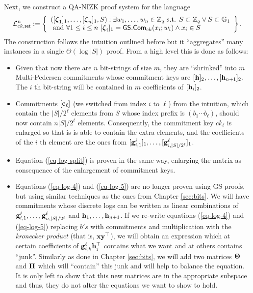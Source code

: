 Next, we construct a QA-NIZK proof system for the language
$$
\Lang_{ck,\mathsf{set}}^n:=\left\{\begin{array}{l}
([\grkb{\zeta}_1]_1,\ldots,[\grkb{\zeta}_n]_1,S):\exists w_1,\ldots,w_n\in\Z_q \text{ s.t. } S\subset\Z_q\vee S\subset \GG_1\\
\text{ and } \forall 1\leq i\leq n\ [\grkb{\zeta}_i]_1=\GS.\Com_{ck}(x_i;w_i)\wedge x_i\in S
\end{array}\right\}.
$$
The construction follows the intuition outlined before but it ``aggregates'' many instances in a single $\Theta(\log |S|)$ proof. From a high level this is done as follows:
\begin{itemize}
\item Given that now there are $n$ bit-strings of size $m$, they are ``shrinked'' into $m$ Multi-Pedersen commitments whose commitment keys are $[\mathbf{h}]_2,\ldots,[\mathbf{h}_{n+1}]_2$. The $i$ th bit-string will be contained in $m$ coefficients of $[\mathbf{h}_i]_2$.
\item Commitments $[\mathbf{c}_\ell]$ (we switched from index $i$ to $\ell$) from the intuition, which contain the $|S|/2^\ell$ elements from $S$ whose index prefix is $(b_1\cdots b_{\ell})$, should now contain $n|S|/2^\ell$ elements. Consequently, the commitment key $ck_\ell$ is enlarged so that is is able to contain the extra elements, and the coefficients of the $i$ th element are the ones from $[\mathbf{g}_{i,1}^\ell]_1,\ldots,[\mathbf{g}_{i,|S|/2^\ell}^\ell]_1$.
\item Equation (\ref{eq-log-split}) is proven in the same way, enlarging the matrix as consequence of the enlargement of commitment keys.
\item Equations (\ref{eq-log-4}) and (\ref{eq-log-5}) are no longer proven using GS proofs, but using similar techniques as the ones from Chapter \ref{sec:bits}. We will have commitments whose discrete logs can be written as linear combinations of $\mathbf{g}_{i,1}^\ell,\ldots,\mathbf{g}_{n,|S|/2^\ell}^\ell$ and $\mathbf{h}_1,\ldots,\mathbf{h}_{n+1}$. If we re-write equations (\ref{eq-log-4}) and (\ref{eq-log-5}) replacing $b's$ with commitments and multiplication with the \emph{kronecker product} (that is, $\mathbf{x}\mathbf{y}^\top$), we will obtain an expression which at certain coefficients of $\mathbf{g}_{i,k}^\ell\mathbf{h}_j^\top$ contains what we want and at others contains ``junk''. Similarly as done in Chapter \ref{sec:bits}, we will add two matrices $\mathbf{{\Theta}}$ and $\mathbf{{\Pi}}$ which will ``contain'' this junk and will help to balance the equation. It is only left to show that this new matrices are in the appropriate subspace and thus, they do not alter the equations we want to show to hold. 
\end{itemize}
